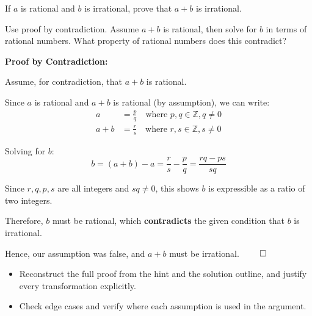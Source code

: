 
\begin{problem}
If $a$ is rational and $b$ is irrational, prove that $a + b$ is irrational.
\end{problem}

\begin{hint}
Use proof by contradiction. Assume $a + b$ is rational, then solve for $b$ in terms of rational numbers. What property of rational numbers does this contradict?
\end{hint}

\begin{solution}
\textbf{Proof by Contradiction:}

Assume, for contradiction, that $a + b$ is rational.

Since $a$ is rational and $a + b$ is rational (by assumption), we can write:
\begin{align*}
a &= \frac{p}{q} \quad \text{where } p, q \in \mathbb{Z}, q \neq 0 \\
a + b &= \frac{r}{s} \quad \text{where } r, s \in \mathbb{Z}, s \neq 0
\end{align*}

Solving for $b$:
\[
b = (a + b) - a = \frac{r}{s} - \frac{p}{q} = \frac{rq - ps}{sq}
\]

Since $r, q, p, s$ are all integers and $sq \neq 0$, this shows $b$ is expressible as a ratio of two integers.

Therefore, $b$ must be rational, which \textbf{contradicts} the given condition that $b$ is irrational.

Hence, our assumption was false, and $a + b$ must be irrational. $\qed$
\end{solution}

\begin{takeaways}
\begin{itemize}[leftmargin=*]
\item Reconstruct the full proof from the hint and the solution outline, and justify every transformation explicitly.
\item Check edge cases and verify where each assumption is used in the argument.
\end{itemize}
\end{takeaways}
